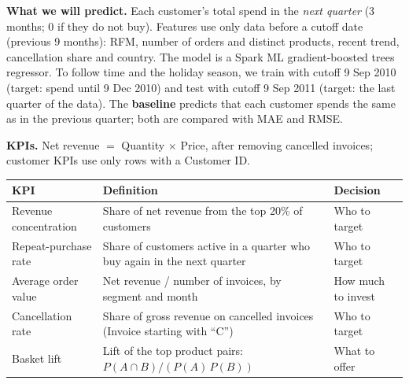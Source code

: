 \documentclass[11pt,a4paper]{article}
\begin{document}
\textbf{What we will predict.} Each customer's total spend in the \emph{next quarter} (3 months; 0 if they do
not buy). Features use only data before a cutoff date (previous 9 months): RFM, number of orders and distinct
products, recent trend, cancellation share and country. The model is a Spark ML gradient-boosted trees
regressor. To follow time and the holiday season, we train with cutoff 9 Sep 2010 (target: spend until
9 Dec 2010) and test with cutoff 9 Sep 2011 (target: the last quarter of the data). The \textbf{baseline}
predicts that each customer spends the same as in the previous quarter; both are compared with MAE and RMSE.

\textbf{KPIs.} Net revenue $=$ Quantity $\times$ Price, after removing cancelled invoices; customer KPIs use
only rows with a Customer ID.

\begin{tabularx}{\linewidth}{@{}lXl@{}}
  \toprule
  \textbf{KPI} & \textbf{Definition} & \textbf{Decision} \\
  \midrule
  Revenue concentration & Share of net revenue from the top 20\% of customers & Who to target \\
  Repeat-purchase rate  & Share of customers active in a quarter who buy again in the next quarter & Who to target \\
  Average order value   & Net revenue / number of invoices, by segment and month & How much to invest \\
  Cancellation rate     & Share of gross revenue on cancelled invoices (Invoice starting with ``C'') & Who to target \\
  Basket lift           & Lift of the top product pairs: $P(A \cap B) / (P(A)\,P(B))$ & What to offer \\
  \bottomrule
\end{tabularx}

\end{document}
